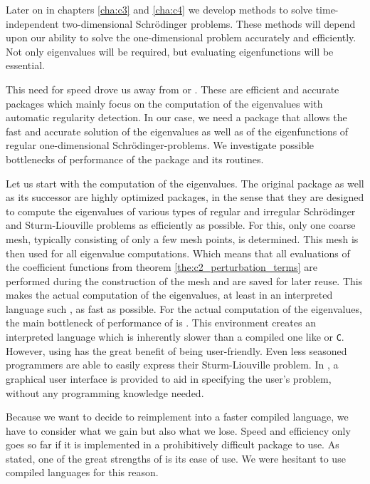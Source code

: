 Later on in chapters \ref{cha:c3} and \ref{cha:c4} we develop methods to solve time-independent two-dimensional Schrödinger problems. These methods will depend upon our ability to solve the one-dimensional problem accurately and efficiently. Not only eigenvalues will be required, but evaluating eigenfunctions will be essential.

This need for speed drove us away from \matslise{} or . These are efficient and accurate packages which mainly focus on the computation of the eigenvalues with automatic regularity detection. In our case, we need a package that allows the fast and accurate solution of the eigenvalues as well as of the eigenfunctions of regular one-dimensional Schrödinger-problems. We investigate possible bottlenecks of performance of the  package and its routines.

Let us start with the computation of the eigenvalues. The original \matslise{} package as well as its successor  are highly optimized packages, in the sense that they are designed to compute the eigenvalues of various types of regular and irregular Schrödinger and Sturm-Liouville problems as efficiently as possible. For this, only one coarse mesh, typically consisting of only a few mesh points, is determined. This mesh is then used for all eigenvalue computations. Which means that all evaluations of the coefficient functions from theorem \ref{the:c2_perturbation_terms} are performed during the construction of the mesh and are saved for later reuse. This makes the actual computation of the eigenvalues, at least in an interpreted language such \matlab{}, as fast as possible. For the actual computation of the eigenvalues, the main bottleneck of performance of  is \matlab{}. This environment creates an interpreted language which is inherently slower than a compiled one like \fortran{} or \texttt{C}. However, using \matlab{} has the great benefit of being user-friendly. Even less seasoned programmers are able to easily express their Sturm-Liouville problem. In , a graphical user interface is provided to aid in specifying the user's problem, without any programming knowledge needed.

Because we want to decide to reimplement \matslise{} into a faster compiled language, we have to consider what we gain but also what we lose. Speed and efficiency only goes so far if it is implemented in a prohibitively difficult package to use. As stated, one of the great strengths of  is its ease of use. We were hesitant to use compiled languages for this reason.

